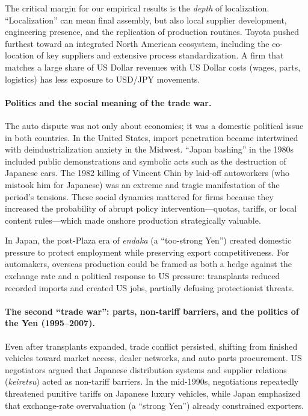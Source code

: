 \documentclass[12pt,a4paper]{article}
\begin{document}
The critical margin for our empirical results is the \emph{depth} of localization. ``Localization'' can mean final assembly, but also local supplier development, engineering presence, and the replication of production routines. Toyota pushed furthest toward an integrated North American ecosystem, including the co-location of key suppliers and extensive process standardization. A firm that matches a large share of US Dollar revenues with US Dollar costs (wages, parts, logistics) has less exposure to USD/JPY movements.

\paragraph{Politics and the social meaning of the trade war.}

The auto dispute was not only about economics; it was a domestic political issue in both countries. In the United States, import penetration became intertwined with deindustrialization anxiety in the Midwest. ``Japan bashing'' in the 1980s included public demonstrations and symbolic acts such as the destruction of Japanese cars. The 1982 killing of Vincent Chin by laid-off autoworkers (who mistook him for Japanese) was an extreme and tragic manifestation of the period's tensions. These social dynamics mattered for firms because they increased the probability of abrupt policy intervention---quotas, tariffs, or local content rules---which made onshore production strategically valuable.

In Japan, the post-Plaza era of \textit{endaka} (a ``too-strong Yen'') created domestic pressure to protect employment while preserving export competitiveness. For automakers, overseas production could be framed as both a hedge against the exchange rate and a political response to US pressure: transplants reduced recorded imports and created US jobs, partially defusing protectionist threats.

\paragraph{The second ``trade war'': parts, non-tariff barriers, and the politics of the Yen (1995--2007).}

Even after transplants expanded, trade conflict persisted, shifting from finished vehicles toward market access, dealer networks, and auto parts procurement. US negotiators argued that Japanese distribution systems and supplier relations (\textit{keiretsu}) acted as non-tariff barriers. In the mid-1990s, negotiations repeatedly threatened punitive tariffs on Japanese luxury vehicles, while Japan emphasized that exchange-rate overvaluation (a ``strong Yen'') already constrained exporters.
\end{document}
